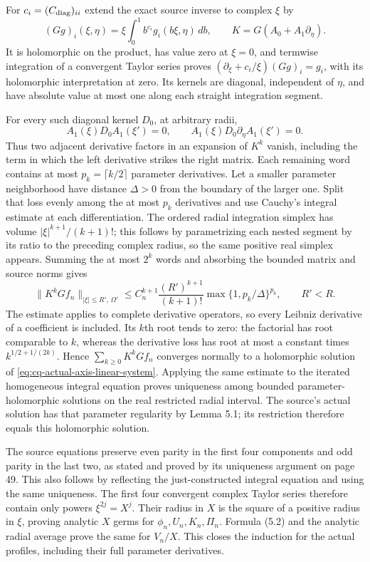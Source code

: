 For $c_i=(C_{\rm diag})_{ii}$ extend the exact source inverse
to complex $\xi$ by
\[
 (Gg)_i(\xi,\eta)=
       \xi\int_0^1b^{c_i}g_i(b\xi,\eta)\,db,\qquad
 K=G(A_0+A_1\partial_\eta).
\]
It is holomorphic on the product, has value zero at $\xi=0$,
and termwise integration of a convergent Taylor series proves
$(\partial_\xi+c_i/\xi)(Gg)_i=g_i$, with its holomorphic
interpretation at zero. Its kernels are diagonal, independent
of $\eta$, and have absolute value at most one along each
straight integration segment.

For every such diagonal kernel $D_0$, at arbitrary radii,
\[
 A_1(\xi)D_0A_1(\xi')=0,\qquad
 A_1(\xi)D_0\partial_\eta A_1(\xi')=0.
\]
Thus two adjacent derivative factors in an expansion of $K^k$
vanish, including the term in which the left derivative strikes
the right matrix. Each remaining word contains at most
$p_k=\lceil k/2\rceil$ parameter derivatives. Let a smaller
parameter neighborhood have distance $\Delta>0$ from the
boundary of the larger one. Split that loss evenly among the
at most $p_k$ derivatives and use Cauchy's integral estimate at
each differentiation. The ordered radial integration simplex
has volume $|\xi|^{k+1}/(k+1)!$; this follows by parametrizing
each nested segment by its ratio to the preceding complex
radius, so the same positive real simplex appears. Summing
the at most $2^k$ words and absorbing the bounded matrix and
source norms gives
\begin{equation}
 \|K^kGf_n\|_{|\xi|\leq R',\,\Omega'}
 \leq C_n^{k+1}\frac{(R')^{k+1}}{(k+1)!}
           \max\{1,p_k/\Delta\}^{p_k},\qquad R'<R .
 \label{eq:cq-actual-complex-axis-Picard-bound}
\end{equation}
The estimate applies to complete derivative operators, so every
Leibniz derivative of a coefficient is included.
Its $k$th root tends to zero: the factorial has root comparable
to $k$, whereas the derivative loss has root at most a constant
times $k^{1/2+1/(2k)}$. Hence
$\sum_{k\geq0}K^kGf_n$ converges normally to a holomorphic
solution of \eqref{eq:cq-actual-axis-linear-system}. Applying
the same estimate to the iterated homogeneous integral equation
proves uniqueness among bounded parameter-holomorphic solutions
on the real restricted radial interval. The source's actual
solution has that parameter regularity by Lemma 5.1; its
restriction therefore equals this holomorphic solution.

The source equations preserve even parity in the first four
components and odd parity in the last two, as stated and proved
by its uniqueness argument on page 49. This also follows by
reflecting the just-constructed integral equation and using the
same uniqueness. The first four convergent complex Taylor
series therefore contain only powers $\xi^{2j}=X^j$.
Their radius in $X$ is the square of a positive radius in
$\xi$, proving analytic $X$ germs for $\phi_n,U_n,K_n,\Pi_n$.
Formula (5.2) and the analytic radial average prove the same
for $V_n/X$. This closes the induction for the actual profiles,
including their full parameter derivatives.

